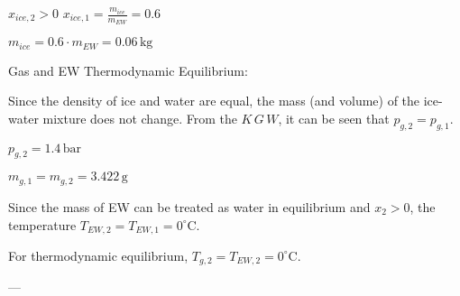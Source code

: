 \( x_{ice,2} > 0 \)  
\( x_{ice,1} = \frac{m_{ice}}{m_{EW}} = 0.6 \)  

\( m_{ice} = 0.6 \cdot m_{EW} = 0.06 \, \text{kg} \)  

Gas and EW Thermodynamic Equilibrium:  

Since the density of ice and water are equal, the mass (and volume) of the ice-water mixture does not change. From the \( K \, G \, W \), it can be seen that \( p_{g,2} = p_{g,1} \).  

\( p_{g,2} = 1.4 \, \text{bar} \)

\( m_{g,1} = m_{g,2} = 3.422 \, \text{g} \)  

Since the mass of EW can be treated as water in equilibrium and \( x_2 > 0 \), the temperature \( T_{EW,2} = T_{EW,1} = 0^\circ \text{C} \).  

For thermodynamic equilibrium, \( T_{g,2} = T_{EW,2} = 0^\circ \text{C} \).  

---